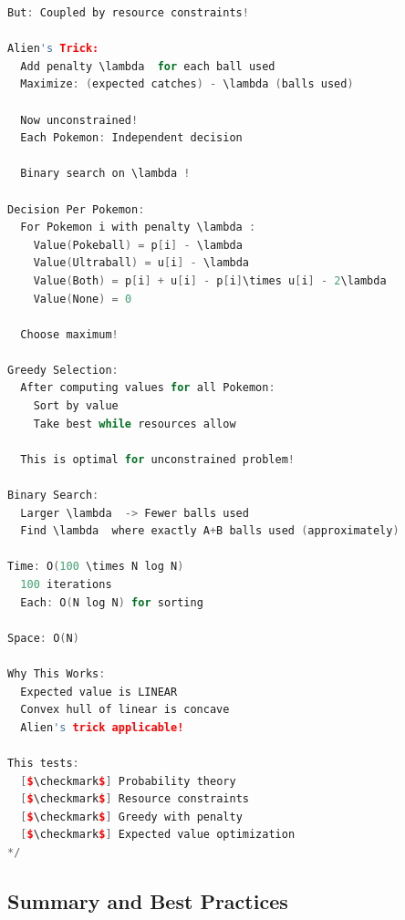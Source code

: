 \documentclass[11pt,a4paper,oneside]{book}
\begin{document}
\begin{lstlisting}[language=C++, caption=COMPLETE Alien's Trick Solution - THE DEFINITIVE PROBLEM]
  But: Coupled by resource constraints!

Alien's Trick:
  Add penalty \lambda  for each ball used
  Maximize: (expected catches) - \lambda (balls used)
  
  Now unconstrained!
  Each Pokemon: Independent decision
  
  Binary search on \lambda !

Decision Per Pokemon:
  For Pokemon i with penalty \lambda :
    Value(Pokeball) = p[i] - \lambda 
    Value(Ultraball) = u[i] - \lambda 
    Value(Both) = p[i] + u[i] - p[i]\times u[i] - 2\lambda 
    Value(None) = 0
  
  Choose maximum!

Greedy Selection:
  After computing values for all Pokemon:
    Sort by value
    Take best while resources allow
  
  This is optimal for unconstrained problem!

Binary Search:
  Larger \lambda  -> Fewer balls used
  Find \lambda  where exactly A+B balls used (approximately)

Time: O(100 \times N log N)
  100 iterations
  Each: O(N log N) for sorting

Space: O(N)

Why This Works:
  Expected value is LINEAR
  Convex hull of linear is concave
  Alien's trick applicable!

This tests:
  [$\checkmark$] Probability theory
  [$\checkmark$] Resource constraints
  [$\checkmark$] Greedy with penalty
  [$\checkmark$] Expected value optimization
*/
\end{lstlisting}

\subsection{Summary and Best Practices}
\end{document}

